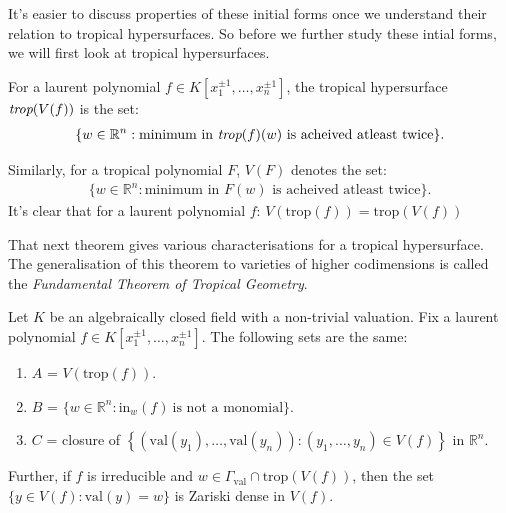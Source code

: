     It's easier to discuss properties of these initial forms once we understand their relation to tropical hypersurfaces.
    So before we further study these intial forms, we will first look at tropical hypersurfaces.
    \begin{definition}
        For a laurent polynomial $f \in  K[x_{1}^{\pm1}, \dots, x_{n}^{\pm1}] $, the tropical hypersurface $\emph{trop}(V(f))$ is the set:
        \begin{align*}
        \{w \in \mathbb{R}^{n}: \text{minimum in }\emph{trop}(f)(w)\text{ is acheived atleast twice}\}.
        \end{align*}
    \end{definition}
    Similarly, for a tropical polynomial $F$, $V(F)$ denotes the set:
    \begin{align*}
        \{w \in \mathbb{R}^{n}: \text{minimum in }F(w)\text{ is acheived atleast twice}\}.
    \end{align*}
    It's clear that for a laurent polynomial $f$: $V(\text{trop}(f)) = \text{trop}(V(f))$

    That next theorem gives various characterisations for a tropical hypersurface.
    The generalisation of this theorem to varieties of higher codimensions is called the \textit{Fundamental Theorem of Tropical Geometry}.
    \begin{theorem}
    Let $K$ be an algebraically closed field with a non-trivial valuation. Fix a laurent polynomial $f \in K[x_{1}^{\pm1}, \dots, x_{n}^{\pm1}]$. The following sets are the same:
    \begin{enumerate}
        \item $A$ = $V(\text{trop}(f))$.
        \item $B$ = $\{w \in \mathbb{R}^{n}: \text{in}_{w}(f)~ \text{is not a monomial}\}$.
        \item $C$ = closure of $\left\{(\text{val}(y_1), \dots, \text{val}(y_n)): (y_1,\dots, y_n) \in V(f)\right\}$ in $\mathbb{R}^{n}$.
    \end{enumerate}
    Further, if $f$ is irreducible and $w \in \Gamma_{\text{val}} \cap \text{trop}(V(f))$, then the set $\{y \in V(f): \text{val}(y) = w\}$ is Zariski dense in $V(f)$.
    \end{theorem}


